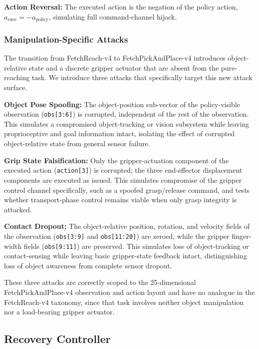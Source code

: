 \documentclass[conference]{IEEEtran}
\begin{document}
\textbf{Action Reversal:} The executed action is the negation of the policy action,
$a_{\mathrm{exec}} = -a_{\mathrm{policy}}$, simulating full command-channel hijack.

\subsubsection{Manipulation-Specific Attacks}

The transition from FetchReach-v4 to FetchPickAndPlace-v4 introduces object-relative
state and a discrete gripper actuator that are absent from the pure-reaching task. We
introduce three attacks that specifically target this new attack surface.

\textbf{Object Pose Spoofing:} The object-position sub-vector of the policy-visible
observation (\texttt{obs[3:6]}) is corrupted, independent of the rest of the
observation. This simulates a compromised object-tracking or vision subsystem while
leaving proprioceptive and goal information intact, isolating the effect of corrupted
object-relative state from general sensor failure.

\textbf{Grip State Falsification:} Only the gripper-actuation component of the
executed action (\texttt{action[3]}) is corrupted; the three end-effector displacement
components are executed as issued. This simulates compromise of the gripper control
channel specifically, such as a spoofed grasp/release command, and tests whether
transport-phase control remains viable when only grasp integrity is attacked.

\textbf{Contact Dropout:} The object-relative position, rotation, and velocity fields
of the observation (\texttt{obs[3:9]} and \texttt{obs[11:20]}) are zeroed, while the
gripper finger-width fields (\texttt{obs[9:11]}) are preserved. This simulates loss of
object-tracking or contact-sensing while leaving basic gripper-state feedback intact,
distinguishing loss of object awareness from complete sensor dropout.

These three attacks are correctly scoped to the 25-dimensional FetchPickAndPlace-v4
observation and action layout and have no analogue in the FetchReach-v4 taxonomy, since
that task involves neither object manipulation nor a load-bearing gripper actuator.

\subsection{Recovery Controller}
\end{document}
